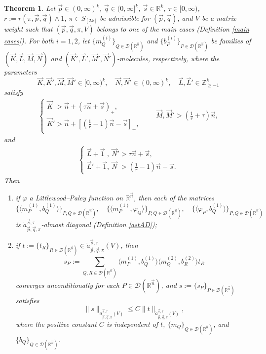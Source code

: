 \documentclass[11pt, reqno]{amsart}
\newtheorem{theorem}{Theorem}[section]
\theoremstyle{definition}
\theoremstyle{remark}
\numberwithin{equation}{section}
\newcommand{\R}{\mathbb R}
\newcommand{\Z}{\mathbb Z}
\newcommand{\vone}{\vec 1}
\newcommand{\vn}{\vec n}
\newcommand{\vp}{\vec p}
\newcommand{\vq}{\vec q}
\newcommand{\vs}{\vec s}
\newcommand{\atau}{\dot a^{\vs,\tau}_{\vp,\vq,\pi}}
\begin{document}
\begin{theorem}\label{83}
Let $\vp\in(0,\infty)^k$, $\vq\in(0,\infty]^k$, $\vs\in\R^k$, $\tau\in[0,\infty)$, $r:=r(\pi,\vec p,\vec q)\wedge 1$,
$\pi\in S_{[2k]}$ be admissible for $(\vp,\vq)$,
and $V$ be a matrix weight such that $(\vp,\vq,\pi,V)$ belongs
to one of the main cases (Definition \ref{main cases}).
For both $i=1,2$, let $\{m^{(i)}_Q\}_{Q\in\mathscr D(\R^{\vn})}$ and $\{b^{(i)}_P\}_{P\in\mathscr D(\R^{\vn})}$ be families of $(\vec K,\vec L,\vec M,\vec N)$ and $(\vec K',\vec L',\vec M',\vec N')$-molecules, respectively, where the parameters
\begin{equation*}
  \vec K,\vec K',\vec M,\vec M'\in[0,\infty)^k,\quad
  \vec N,\vec N'\in(0,\infty)^k,\quad\vec L,\vec L'\in\Z_{\geq-1}^k
\end{equation*}
satisfy
\begin{align}\label{KMM}
\begin{cases} \vec K\phantom{'} > \vn+(\tau\vn+\vs)_+, \\ \vec K' >\vn+[(\tfrac1r-1)\vn-\vs]_+,\end{cases}
\qquad \vec M,\vec M'>(\tfrac{1}{r}+\tau)\vn,
\end{align}
and
\begin{align}\label{LNN}
\begin{cases} \vec L+\vone\phantom{'},\ \vec N' > \tau\vn+\vs, \\ \vec L'+\vone,\ \vec N \phantom{'}> (\frac1r-1)\vn-\vs.\end{cases}
\end{align}
Then
\begin{enumerate}[{\rm (i)}]
\item\label{it:eachAD} if $\varphi$ a Littlewood--Paley function on $\mathbb R^{\vec n}$, then each of the matrices
\begin{equation*}
  \Big\{ \Big\langle m_P^{(1)},b_Q^{(1)}\Big\rangle \Big\}_{P,Q\in\mathscr D(\mathbb R^{\vec n})},\quad
  \Big\{ \Big\langle m_P^{(1)},\varphi_Q\Big\rangle \Big\}_{P,Q\in\mathscr D(\mathbb R^{\vec n})},\quad
  \Big\{ \Big\langle \varphi_P,b_Q^{(1)}\Big\rangle \Big\}_{P,Q\in\mathscr D(\mathbb R^{\vec n})}
\end{equation*}
is $\dot a^{\vec s,\tau}_{\vec p,\vec q,\pi}$-almost diagonal (Definition \ref{astAD});

\item\label{it:convUC} if $t:=\{t_R\}_{R\in\mathscr D(\R^{\vn})}\in\dot a^{\vec s,\tau}_{\vec p,\vec q,\pi}(V)$, then
\begin{equation*}
s_P:=\sum_{Q,R\in\mathscr D(\R^{\vn})}
\Big\langle m_P^{(1)},b_Q^{(1)}\Big\rangle
\Big\langle m_Q^{(2)},b_R^{(2)}\Big\rangle t_R
\end{equation*}
converges unconditionally for each $P\in\mathscr D(\R^{\vn})$,
and $s:=\{s_P\}_{P\in\mathscr D(\R^{\vn})}$ satisfies
\begin{equation*}
\|s\|_{\atau(V)}
\leq C\|t\|_{\atau(V)},
\end{equation*}
where the positive constant $C$ is independent of $t$,
$\{m_Q\}_{Q\in\mathscr D(\R^{\vn})}$, and $\{b_Q\}_{Q\in\mathscr D(\R^{\vn})}$.
\end{enumerate}
\end{theorem}
\end{document}
